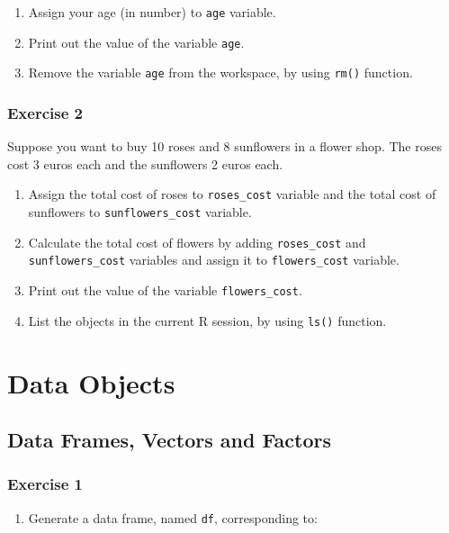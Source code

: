 \documentclass[]{book}
\providecommand{\tightlist}{%
  \setlength{\itemsep}{0pt}\setlength{\parskip}{0pt}}
\def\tightlist{}
\begin{document}
\begin{enumerate}
\def\labelenumi{\alph{enumi}.}
\item
  Assign your age (in number) to \texttt{age} variable.
\item
  Print out the value of the variable \texttt{age}.
\item
  Remove the variable \texttt{age} from the workspace, by using
  \texttt{rm()} function.
\end{enumerate}

\subsection{Exercise 2}\label{exercise-2}

Suppose you want to buy 10 roses and 8 sunflowers in a flower shop. The
roses cost 3 euros each and the sunflowers 2 euros each.

\begin{enumerate}
\def\labelenumi{\alph{enumi}.}
\item
  Assign the total cost of roses to \texttt{roses\_cost} variable and
  the total cost of sunflowers to \texttt{sunflowers\_cost} variable.
\item
  Calculate the total cost of flowers by adding \texttt{roses\_cost} and
  \texttt{sunflowers\_cost} variables and assign it to
  \texttt{flowers\_cost} variable.
\item
  Print out the value of the variable \texttt{flowers\_cost}.
\item
  List the objects in the current R session, by using \texttt{ls()}
  function.
\end{enumerate}

\chapter{Data Objects}\label{data-objects}

\section{Data Frames, Vectors and
Factors}\label{data-frames-vectors-and-factors}

\subsection{Exercise 1}\label{exercise-1-2}

\begin{enumerate}
\def\labelenumi{\alph{enumi}.}
\tightlist
\item
  Generate a data frame, named \texttt{df}, corresponding to:
\end{enumerate}
\end{document}
